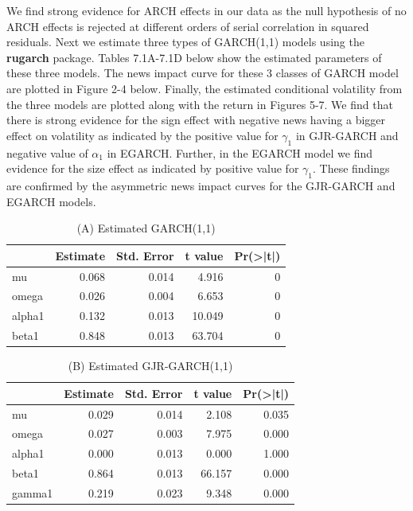 \documentclass[]{book}
\theoremstyle{definition}
\theoremstyle{definition}
\theoremstyle{definition}
\theoremstyle{remark}
\begin{document}
We find strong evidence for ARCH effects in our data as the null hypothesis of no ARCH effects is rejected at different orders of serial correlation in squared residuals. Next we estimate three types of GARCH(1,1) models using the \textbf{rugarch} package. Tables 7.1A-7.1D below show the estimated parameters of these three models. The news impact curve for these 3 classes of GARCH model are plotted in Figure 2-4 below. Finally, the estimated conditional volatility from the three models are plotted along with the return in Figures 5-7. We find that there is strong evidence for the sign effect with negative news having a bigger effect on volatility as indicated by the positive value for \(\gamma_1\) in GJR-GARCH and negative value of \(\alpha_1\) in EGARCH. Further, in the EGARCH model we find evidence for the size effect as indicated by positive value for \(\gamma_1\). These findings are confirmed by the asymmetric news impact curves for the GJR-GARCH and EGARCH models.

\begin{table}[t]

\caption{\label{tab:unnamed-chunk-11}(A) Estimated GARCH(1,1)}
\centering
\begin{tabular}{l|r|r|r|r}
\hline
  &  Estimate &  Std. Error &  t value & Pr(>|t|)\\
\hline
mu & 0.068 & 0.014 & 4.916 & 0\\
\hline
omega & 0.026 & 0.004 & 6.653 & 0\\
\hline
alpha1 & 0.132 & 0.013 & 10.049 & 0\\
\hline
beta1 & 0.848 & 0.013 & 63.704 & 0\\
\hline
\end{tabular}
\end{table}

\begin{table}[t]

\caption{\label{tab:unnamed-chunk-11}(B) Estimated GJR-GARCH(1,1)}
\centering
\begin{tabular}{l|r|r|r|r}
\hline
  &  Estimate &  Std. Error &  t value & Pr(>|t|)\\
\hline
mu & 0.029 & 0.014 & 2.108 & 0.035\\
\hline
omega & 0.027 & 0.003 & 7.975 & 0.000\\
\hline
alpha1 & 0.000 & 0.013 & 0.000 & 1.000\\
\hline
beta1 & 0.864 & 0.013 & 66.157 & 0.000\\
\hline
gamma1 & 0.219 & 0.023 & 9.348 & 0.000\\
\hline
\end{tabular}
\end{table}
\end{document}

